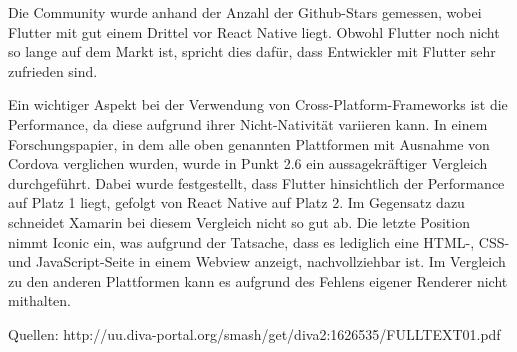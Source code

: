Die Community wurde anhand der Anzahl der Github-Stars gemessen, wobei Flutter mit gut einem Drittel vor React Native liegt. Obwohl Flutter noch nicht so lange auf dem Markt ist, spricht dies dafür, dass Entwickler mit Flutter sehr zufrieden sind.

Ein wichtiger Aspekt bei der Verwendung von Cross-Platform-Frameworks ist die Performance, da diese aufgrund ihrer Nicht-Nativität variieren kann. In einem Forschungspapier, in dem alle oben genannten Plattformen mit Ausnahme von Cordova verglichen wurden, wurde in Punkt 2.6 ein aussagekräftiger Vergleich durchgeführt. Dabei wurde festgestellt, dass Flutter hinsichtlich der Performance auf Platz 1 liegt, gefolgt von React Native auf Platz 2. Im Gegensatz dazu schneidet Xamarin bei diesem Vergleich nicht so gut ab. Die letzte Position nimmt Iconic ein, was aufgrund der Tatsache, dass es lediglich eine HTML-, CSS- und JavaScript-Seite in einem Webview anzeigt, nachvollziehbar ist. Im Vergleich zu den anderen Plattformen kann es aufgrund des Fehlens eigener Renderer nicht mithalten.

Quellen:
http://uu.diva-portal.org/smash/get/diva2:1626535/FULLTEXT01.pdf








